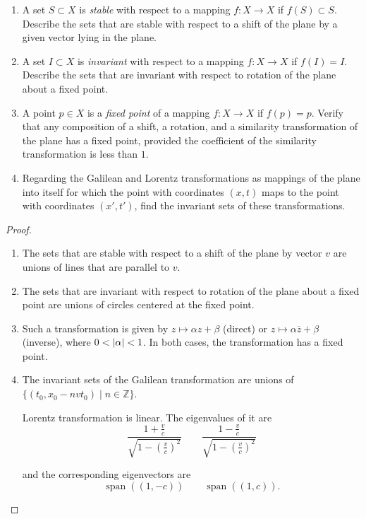 \begin{exercise}
    \begin{enumerate}[label={(\alph*)}]
        \item A set $S \subset X$ is \textit{stable} with respect to a mapping $f: X \to X$ if $f(S) \subset S$. Describe the sets that are stable with respect to a shift of the plane by a given vector lying in the plane.
        \item A set $I \subset X$ is \textit{invariant} with respect to a mapping $f: X \to X$ if $f(I) = I$. Describe the sets that are invariant with respect to rotation of the plane about a fixed point.
        \item A point $p\in X$ is a \textit{fixed point} of a mapping $f: X\to X$ if $f(p) = p$. Verify that any composition of a shift, a rotation, and a similarity transformation of the plane has a fixed point, provided the coefficient of the similarity transformation is less than $1$.
        \item Regarding the Galilean and Lorentz transformations as mappings of the plane into itself for which the point with coordinates $(x, t)$ maps to the point with coordinates $(x' , t')$, find the invariant sets of these transformations.
    \end{enumerate}
\end{exercise}

\begin{proof}
    \begin{enumerate}[label={(\alph*)}]
        \item The sets that are stable with respect to a shift of the plane by vector $v$ are unions of lines that are parallel to $v$.
        \item The sets that are invariant with respect to rotation of the plane about a fixed point are unions of circles centered at the fixed point.
        \item Such a transformation is given by $z\mapsto \alpha z + \beta$ (direct) or $z\mapsto \alpha \overline{z} + \beta$ (inverse), where $0 < \left\vert{\alpha}\right\vert < 1$. In both cases, the transformation has a fixed point.
        \item The invariant sets of the Galilean transformation are unions of $\{ (t_{0}, x_{0} - nvt_{0}) \mid n\in\mathbb{Z} \}$.

              Lorentz transformation is linear. The eigenvalues of it are
              \[
                  \frac{1 + \frac{v}{c}}{\sqrt{1 - {\left(\frac{v}{c}\right)}^{2}}}\qquad \frac{1 - \frac{v}{c}}{\sqrt{1 - {\left(\frac{v}{c}\right)}^{2}}}
              \]

              and the corresponding eigenvectors are
              \[
                  \operatorname{span}\left(\left(1, -c\right)\right)\qquad \operatorname{span}\left(\left(1, c\right)\right).
              \]
    \end{enumerate}
\end{proof}
\newpage

